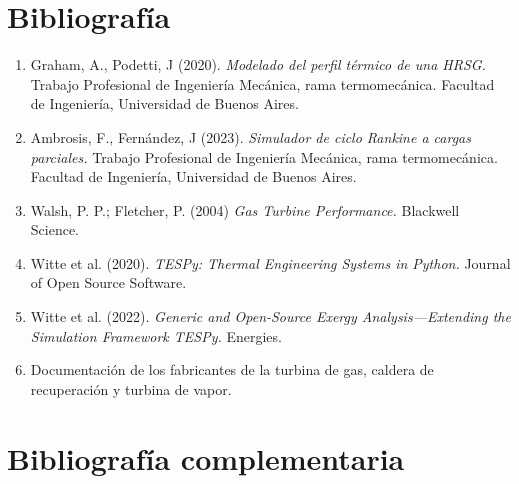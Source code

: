 \documentclass[a4paper]{article}
\begin{document}
\newpage
\section*{Bibliografía}
\begin{enumerate}

\item Graham, A., Podetti, J (2020). \textit{Modelado del perfil térmico de una HRSG.} Trabajo Profesional de Ingeniería Mecánica, rama termomecánica. Facultad de Ingeniería, Universidad de Buenos Aires.

\item Ambrosis, F., Fernández, J (2023). \textit{Simulador de ciclo Rankine a cargas parciales.} Trabajo Profesional de Ingeniería Mecánica, rama termomecánica. Facultad de Ingeniería, Universidad de Buenos Aires.

\item Walsh, P. P.; Fletcher, P. (2004) \textit{Gas Turbine Performance.} Blackwell Science.

\item Witte et al. (2020). \textit{TESPy: Thermal Engineering Systems in Python.} Journal of Open Source Software.

\item Witte et al. (2022). \textit{Generic and Open-Source Exergy Analysis—Extending the
Simulation Framework TESPy.} Energies.

\item Documentación de los fabricantes de la turbina de gas, caldera de recuperación y turbina de vapor.

\end{enumerate}

\section*{Bibliografía complementaria}
\end{document}
